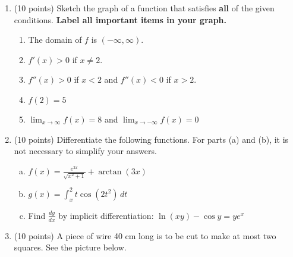 \documentclass[11pt]{article}
\renewcommand{\d}{\displaystyle}
\begin{document}
\begin{enumerate}
\begin{enumerate}
\vfill
\end{enumerate}
\newpage
\item (10 points) Sketch the graph of a function that satisfies \textbf{all} of the given conditions. \textbf{Label all important items in your graph.}
	\begin{enumerate}
	\item The domain of $f$ is $(-\infty,\infty).$
	\item $f'(x) > 0$ if $x \not = 2.$\\
	\item $f''(x) > 0$ if $x < 2$ and $f''(x) <0$ if $x>2.$\\
	\item $f(2)=5$\\
	\item $\displaystyle \lim_{x \to \infty} f(x)=8$ and $\displaystyle \lim_{x \to -\infty} f(x)=0$\\
	\end{enumerate}
	\begin{center}
	\end{center}
\newpage
\item (10 points) Differentiate the following functions. For parts (a) and (b), it is not necessary to simplify your answers.

\begin{enumerate}[(a)]
	\item $\d f(x) = \frac{e^{2x}}{\sqrt{x^2 + 1}} + \arctan(3x)$
	\vfill
	\item $\d g(x) = \int_x^2 t\cos(2t^2)\,dt$
	\vspace{1.5in}
	\item Find $\frac{dy}{dx}$ by implicit differentiation: $\d \ln(xy) - \cos y = ye^x$
	\vspace{3.5in}
	
	
\end{enumerate}

\newpage


\item (10 points) A piece of wire 40 cm long is to be cut to make at most two squares. See the picture below.

\begin{center}
\end{center}


\end{enumerate}
\end{document}
